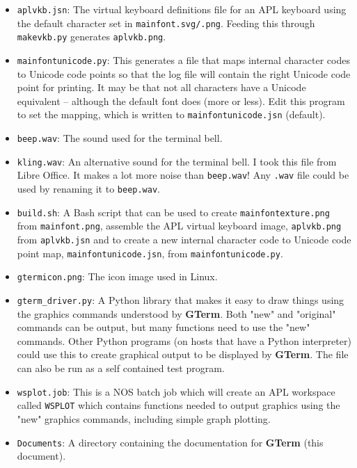 \documentclass[a4paper,twoside,11pt]{article}
\begin{document}
\begin{itemize}
\item \texttt{aplvkb.jsn}: The virtual keyboard definitions file for an APL keyboard using the default character set in
      \texttt{mainfont.svg/.png}. Feeding this through \texttt{makevkb.py} generates \texttt{aplvkb.png}.
\item \texttt{mainfontunicode.py}: This generates a file that maps internal character codes to Unicode code points so that
      the log file will contain the right Unicode code point for printing. It may be that not all characters have 
      a Unicode equivalent -- although the default font does (more or less). Edit this program to set the mapping,
      which is written to \texttt{mainfontunicode.jsn} (default).
\item \texttt{beep.wav}: The sound used for the terminal bell.
\item \texttt{kling.wav}: An alternative sound for the terminal bell. I took this file from Libre Office. It makes a lot more noise
	than \texttt{beep.wav}!  Any \texttt{.wav} file could be used by renaming it to \texttt{beep.wav}.
\item \texttt{build.sh}: A Bash script that can be used to create \texttt{mainfontexture.png}
      from \texttt{mainfont.png}, assemble the APL virtual
      keyboard image, \texttt{aplvkb.png} from \texttt{aplvkb.jsn} and to create a new internal 
      character code to Unicode code point map,
      \texttt{mainfontunicode.jsn}, from \texttt{mainfontunicode.py}.
\item \texttt{gtermicon.png}: The icon image used in Linux.
\item \texttt{gterm\_driver.py}: A Python library that makes it easy to draw things using the graphics commands 
		understood by \textbf{GTerm}. Both "new" and "original" commands can be output, but many functions need to use
		the "new" commands. Other Python programs (on hosts that have a Python interpreter) could use this to create 
		graphical output to be displayed by \textbf{GTerm}. The file can also be run as a self contained test program.
\item \texttt{wsplot.job}: This is a NOS batch job which will create an APL workspace called \texttt{WSPLOT} which contains functions
		needed to output graphics using the "new" graphics commands, including simple graph plotting.
\item \texttt{Documents}: A directory containing the documentation for \textbf{GTerm} (this document).
\end{itemize}
\end{document}
